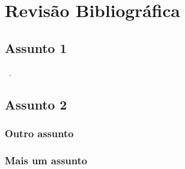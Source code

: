 \section{Revisão Bibliográfica}

\lipsum[1-5]%

\subsection{Assunto 1}
\lipsum[6]~\cite{Hossoda2024}.

\subsection{Assunto 2}
\subsubsection{Outro assunto}
\lipsum[7-10]%

\subsubsection{Mais um assunto}

\lipsum[7-10]%
